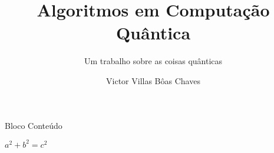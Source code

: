 \documentclass[comp]{bimer}
\author{Victor Villas Bôas Chaves}
\title{Algoritmos em Computação Quântica}
\subtitle{Um trabalho sobre as coisas quânticas}
\institute{IME}
\date{\the\year}
\begin{document}
\printFrontMatter

\begin{frame}
\begin{block}{Bloco}
Conteúdo
\end{block}
\begin{theorem}[Pythagoras] 
$ a^2 + b^2 = c^2$
\end{theorem}
\end{frame}


\printBackMatter

\end{document}
